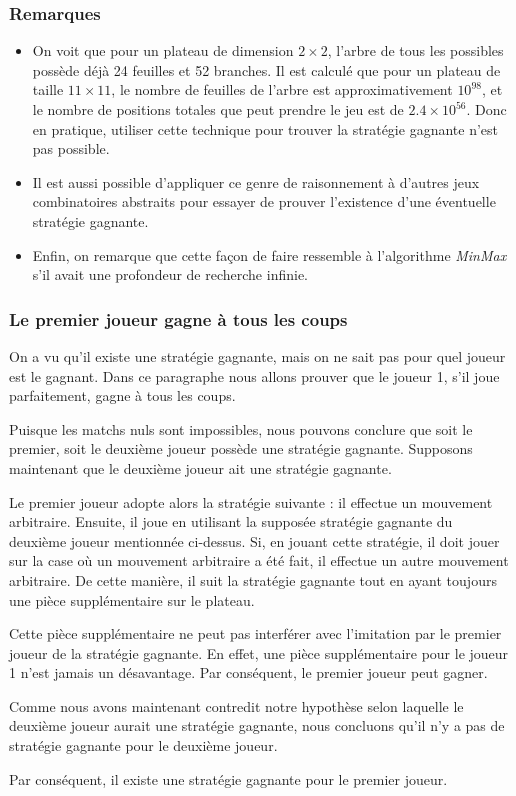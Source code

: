\subsubsection{Remarques}
\begin{itemize}
    \item On voit que pour un plateau de dimension $2\times2$, l'arbre de tous les possibles possède déjà 24 feuilles et 52 branches.
    Il est calculé que pour un plateau de taille $11\times11$, le nombre de feuilles de l'arbre est
    approximativement $10^{98}$, et le nombre de positions totales que peut prendre le jeu est de $2.4\times10^{56}$.
    Donc en pratique, utiliser cette technique pour trouver la stratégie gagnante n'est pas possible.
    \item Il est aussi possible d'appliquer ce genre de raisonnement à d'autres jeux combinatoires abstraits pour essayer de
    prouver l'existence d'une éventuelle stratégie gagnante.
    \item Enfin, on remarque que cette façon de faire ressemble à l'algorithme \emph{MinMax} s'il avait une profondeur de recherche
    infinie.
\end{itemize}

\subsubsection{Le premier joueur gagne à tous les coups}
On a vu qu'il existe une stratégie gagnante, mais on ne sait pas pour quel joueur est le gagnant. Dans ce paragraphe nous allons
prouver que le joueur 1, s'il joue parfaitement, gagne à tous les coups.

Puisque les matchs nuls sont impossibles, nous pouvons conclure que soit le premier, soit le deuxième joueur possède une stratégie
gagnante. Supposons maintenant que le deuxième joueur ait une stratégie gagnante.

Le premier joueur adopte alors la stratégie suivante : il effectue un mouvement arbitraire. Ensuite, 
il joue en utilisant la supposée stratégie gagnante du deuxième joueur mentionnée ci-dessus. Si,
en jouant cette stratégie, il doit jouer sur la case où un mouvement arbitraire a été fait, il effectue
un autre mouvement arbitraire. De cette manière, il suit la stratégie gagnante tout en ayant toujours une pièce
supplémentaire sur le plateau.

Cette pièce supplémentaire ne peut pas interférer avec l'imitation par le premier joueur de la stratégie gagnante.
En effet, une pièce supplémentaire pour le joueur 1 n'est jamais un désavantage. Par conséquent, le premier joueur peut
gagner.

Comme nous avons maintenant contredit notre hypothèse selon laquelle le deuxième joueur aurait une stratégie gagnante,
nous concluons qu'il n'y a pas de stratégie gagnante pour le deuxième joueur.

Par conséquent, il existe une stratégie gagnante pour le premier joueur.